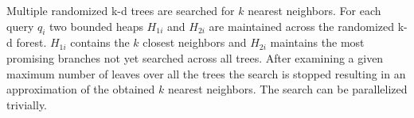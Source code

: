 Multiple randomized k-d trees are searched for  $k$ nearest neighbors. For each query $q_i$ two bounded heaps $H_{1i}$ and $H_{2i}$ are maintained across the randomized k-d forest. $H_{1i}$ contains the $k$ closest neighbors and $H_{2i}$ maintains the most promising branches not yet searched across all trees. After examining a given maximum number of leaves over all the trees the search is stopped resulting in an approximation of the obtained $k$ nearest neighbors. The search can be parallelized trivially. 




